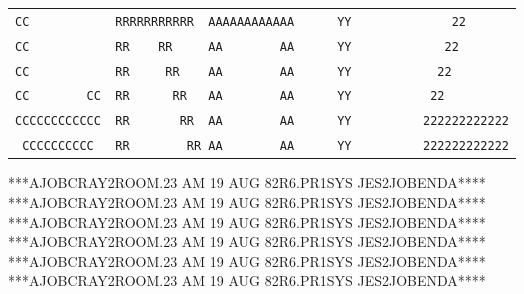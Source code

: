 {\begin{tabular}{l}
\texttt{CC\ \ \ \ \ \ \ \ \ \ \ \ RRRRRRRRRRR\ \ AAAAAAAAAAAA\ \ \ \ \ \ YY\ \ \ \ \ \ \ \ \ \ \ \ \ \ 22}\\
\texttt{CC\ \ \ \ \ \ \ \ \ \ \ \ RR\ \ \ \ RR\ \ \ \ \ AA\ \ \ \ \ \ \ \ AA\ \ \ \ \ \ YY\ \ \ \ \ \ \ \ \ \ \ \ \ 22}\\
\texttt{CC\ \ \ \ \ \ \ \ \ \ \ \ RR\ \ \ \ \ RR\ \ \ \ AA\ \ \ \ \ \ \ \ AA\ \ \ \ \ \ YY\ \ \ \ \ \ \ \ \ \ \ \ 22}\\
\texttt{CC\ \ \ \ \ \ \ \ CC\ \ RR\ \ \ \ \ \ RR\ \ \ AA\ \ \ \ \ \ \ \ AA\ \ \ \ \ \ YY\ \ \ \ \ \ \ \ \ \ \ 22}\\
\texttt{CCCCCCCCCCCC\ \ RR\ \ \ \ \ \ \ RR\ \ AA\ \ \ \ \ \ \ \ AA\ \ \ \ \ \ YY\ \ \ \ \ \ \ \ \ \ 222222222222}\\
\texttt{\ CCCCCCCCCC\ \ \ RR\ \ \ \ \ \ \ \ RR\ AA\ \ \ \ \ \ \ \ AA\ \ \ \ \ \ YY\ \ \ \ \ \ \ \ \ \ 222222222222}\\
\end{tabular}}
{\ttfamily ****A\quad{}\quad JOB\quad CRAY2\quad ROOM.23 AM 19 AUG 82\quad R6.PR1\quad SYS JES2\quad JOB\quad END\quad A****}\\
{\ttfamily ****A\quad{}\quad JOB\quad CRAY2\quad ROOM.23 AM 19 AUG 82\quad R6.PR1\quad SYS JES2\quad JOB\quad END\quad A****}\\
{\ttfamily ****A\quad{}\quad JOB\quad CRAY2\quad ROOM.23 AM 19 AUG 82\quad R6.PR1\quad SYS JES2\quad JOB\quad END\quad A****}\\
{\ttfamily ****A\quad{}\quad JOB\quad CRAY2\quad ROOM.23 AM 19 AUG 82\quad R6.PR1\quad SYS JES2\quad JOB\quad END\quad A****}\\
{\ttfamily ****A\quad{}\quad JOB\quad CRAY2\quad ROOM.23 AM 19 AUG 82\quad R6.PR1\quad SYS JES2\quad JOB\quad END\quad A****}\\
{\ttfamily ****A\quad{}\quad JOB\quad CRAY2\quad ROOM.23 AM 19 AUG 82\quad R6.PR1\quad SYS JES2\quad JOB\quad END\quad A****}\\
